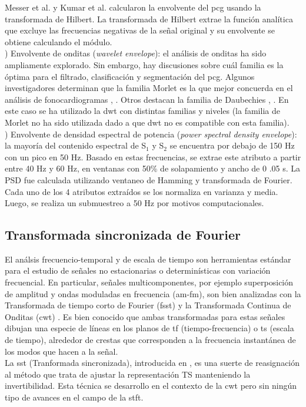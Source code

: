 Messer et al. \cite{ref:messer} y Kumar et al. \cite{ref:kumar} calcularon la envolvente del \gls{pcg} usando
la transformada de Hilbert. La transformada de Hilbert extrae la función analítica que excluye las frecuencias
negativas de la señal original y su envolvente se obtiene calculando el módulo. \\
) Envolvente de onditas (\textit{wavelet envelope}): el análisis de onditas ha sido ampliamente explorado.
Sin embargo, hay discusiones sobre cuál familia es la óptima para el filtrado, clasificación y segmentación del
\gls{pcg}. Algunos investigadores determinan que la familia Morlet es la que mejor concuerda en el análisis de
fonocardiogramas \cite{ref:oskiper-watrous}, \cite{ref:ergen-tatar-gulcur}. Otros destacan la familia de Daubechies
\cite{ref:liang-sakari-iiro}, \cite{ref:gupta}. En este caso se ha utilizado la \gls{dwt} con distintas
familias y niveles (la familia de Morlet no ha sido utilizada dado a que \gls{dwt} no es compatible con esta
familia). \\
) Envolvente de densidad espectral de potencia (\textit{power spectral density envelope}): la mayoría del
contenido espectral de S$_1$ y S$_2$ se encuentra por debajo de 150 Hz con un pico en 50 Hz. Basado en estas
frecuencias, se extrae este atributo a partir entre 40 Hz y 60 Hz, en ventanas con 50\% de solapamiento y ancho de 0
.05 s. La PSD fue calculada utilizando ventaneo de Hamming y transformada de Fourier. \\
\indent Cada uno de los 4 atributos extraídos se los normaliza en varianza y media. Luego, se realiza un submuestreo
a 50 Hz por motivos computacionales.

\subsection*{Transformada sincronizada de Fourier}

El análsis frecuencio-temporal y de escala de tiempo son herramientas estándar para el estudio de señales no
estacionarias o determinísticas con variación frecuencial. En particular, señales multicomponentes, por ejemplo
superposición de amplitud y ondas moduladas en frecuencia (\gls{am}-\gls{fm}), son bien analizadas con la
Transformada de tiempo corto de Fourier (\gls{fsst}) \cite{ref:gabor} y la Transformada Continua de Onditas
(\gls{cwt}) \cite{ref:grossmann-morlet}. Es bien conocido que ambas transformadas para estas señales dibujan
una especie de líneas en los planos de \gls{tf} (tiempo-frecuencia) o \gls{ts} (escala de tiempo),
alrededor de crestas que corresponden a la frecuencia instantánea de los modos que hacen a la señal. \\
\indent La \gls{sst} (Tranformada sincronizada), introducida en \cite{ref:daubechies-maes}, es una suerte de
reasignación al método que trata de ajustar la representación TS manteniendo la invertibilidad. Esta técnica se
desarrollo en el contexto de la \gls{cwt} pero sin ningún tipo de avances en el campo de la \gls{stft}.

